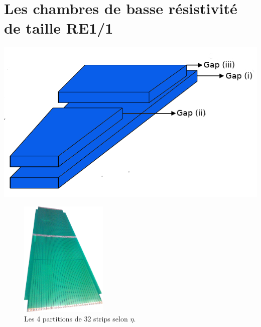 \newpage
\section{Les chambres de basse résistivité de taille RE1/1}

\marginpar
{
	\centering
	\includegraphics[width=1.0\marginparwidth]{GLA/gaps.png}
	\label{gap}
}


\begin{figure}
	\vspace*{-1cm}
	\centering
	\includegraphics[width=0.37\textwidth]{GLA/strips.jpg}
	\caption{Les \num{4} partitions de \num{32} strips selon $\eta$.}
	\label{strips}
\end{figure}

